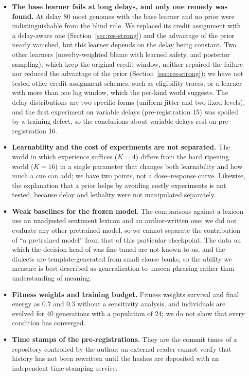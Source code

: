 \begin{itemize}
\item \textbf{The base learner fails at long delays, and only one remedy was found.} At delay 80 most genomes with the base learner and no prior were indistinguishable from the blind rule. We replaced its credit assignment with a delay-aware one (Section~\ref{sec:res-strong}) and the advantage of the prior nearly vanished, but this learner depends on the delay being constant. Two other learners (novelty-weighted blame with learned safety, and posterior sampling), which keep the original credit window, neither repaired the failure nor reduced the advantage of the prior (Section~\ref{sec:res-strong}); we have not tested other credit-assignment schemes, such as eligibility traces, or a learner with more than one lag window, which the per-kind world suggests. The delay distributions are two specific forms (uniform jitter and two fixed levels), and the first experiment on variable delays (pre-registration 15) was spoiled by a training defect, so the conclusions about variable delays rest on pre-registration 16.
\item \textbf{Learnability and the cost of experiments are not separated.} The world in which experience suffices ($K=4$) differs from the hard ripening world ($K=16$) in a single parameter that changes both learnability and how much a cue can add; we have two points, not a dose--response curve. Likewise, the explanation that a prior helps by avoiding costly experiments is not tested, because delay and lethality were not manipulated separately.
\item \textbf{Weak baselines for the frozen model.} The comparisons against a lexicon use an unadjusted sentiment lexicon and an author-written one; we did not evaluate any other pretrained model, so we cannot separate the contribution of ``a pretrained model'' from that of this particular checkpoint. The data on which the decision head of \laya{} was fine-tuned are not known to us, and the dialects are template-generated from small clause banks, so the ability we measure is best described as generalisation to unseen phrasing rather than understanding of meaning.
\item \textbf{Fitness weights and training budget.} Fitness weights survival and final energy as $0.7$ and $0.3$ without a sensitivity analysis, and individuals are evolved for 40 generations with a population of 24; we do not show that every condition has converged.
\item \textbf{Time stamps of the pre-registrations.} They are the commit times of a repository controlled by the author; an external reader cannot verify that history has not been rewritten until the hashes are deposited with an independent time-stamping service.

\end{itemize}
